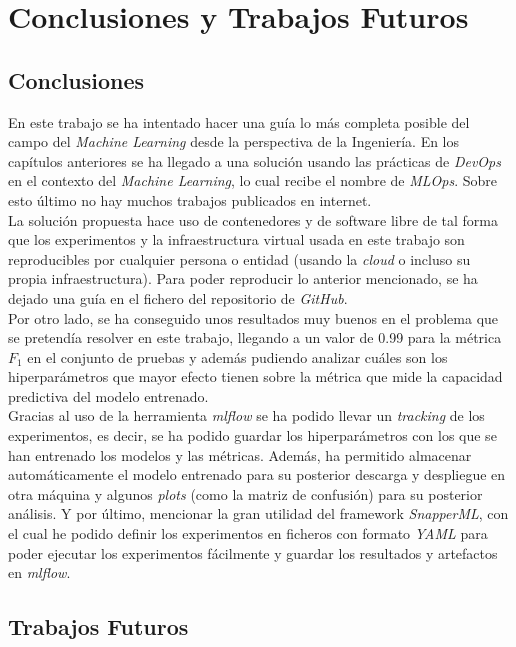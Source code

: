 \chapter{Conclusiones y Trabajos Futuros}

\section{Conclusiones}

En este trabajo se ha intentado hacer una guía lo más completa posible del campo del \textit{Machine Learning} desde la perspectiva de la Ingeniería. En los capítulos anteriores se ha llegado a una solución usando las prácticas de \textit{DevOps} en el contexto del \textit{Machine Learning}, lo cual recibe el nombre de \textit{MLOps}. Sobre esto último no hay muchos trabajos publicados en internet.\\

La solución propuesta hace uso de contenedores y de software libre de tal forma que los experimentos y la infraestructura virtual usada en este trabajo son reproducibles por cualquier persona o entidad (usando la \textit{cloud} o incluso su propia infraestructura). Para poder reproducir lo anterior mencionado, se ha dejado una guía en el fichero  del repositorio de \textit{GitHub}.\\

Por otro lado, se ha conseguido unos resultados muy buenos en el problema que se pretendía resolver en este trabajo, llegando a un valor de 0.99 para la métrica $F_1$ en el conjunto de pruebas y además pudiendo analizar cuáles son los hiperparámetros que mayor efecto tienen sobre la métrica que mide la capacidad predictiva del modelo entrenado.\\

Gracias al uso de la herramienta \textit{mlflow} se ha podido llevar un \textit{tracking} de los experimentos, es decir, se ha podido guardar los hiperparámetros con los que se han entrenado los modelos y las métricas. Además, ha permitido almacenar automáticamente el modelo entrenado para su posterior descarga y despliegue en otra máquina y algunos \textit{plots} (como la matriz de confusión) para su posterior análisis. Y por último, mencionar la gran utilidad del framework \textit{SnapperML}, con el cual he podido definir los experimentos en ficheros con formato \textit{YAML} para poder ejecutar los experimentos fácilmente y guardar los resultados y artefactos en \textit{mlflow}.

\section{Trabajos Futuros}

